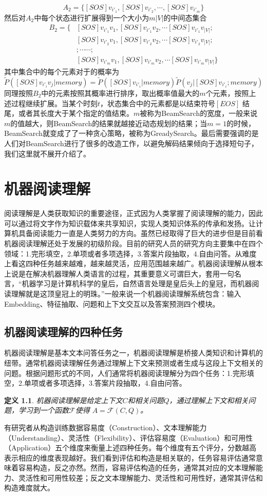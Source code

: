 \documentclass[twoside,a4paper,12pt]{book}%
\newtheorem{definition}{定义}
\begin{document}
$$
A_2=\{[SOS]v_{i'_1},[SOS]v_{i'_2},\cdots,[SOS]v_{i'_m}\}
$$
然后对$A_2$中每个状态进行扩展得到一个大小为$m|V|$的中间态集合
$$
\begin{aligned}
B_2=\{
&[SOS]v_{i'_1}v_1,[SOS]v_{i'_1}v_2,\cdots [SOS]v_{i'_1}v_{|V|};\\
&[SOS]v_{i'_2}v_1,[SOS]v_{i'_2}v_2,\cdots [SOS]v_{i'_2}v_{|V|};\\
&;\cdots \cdots;\\
&[SOS]v_{i'_m}v_1,[SOS]v_{i'_m}v_2,\cdots [SOS]v_{i'_m}v_{|V|}
\}
\end{aligned}
$$
其中集合中的每个元素对于的概率为
$$
\widetilde{P}([SOS]v_{i'_i}v_j|memory)=\widetilde{P}([SOS]v_{i'_i}|memory)\widetilde{P}(v_j|[SOS]v_{i'_i};memory)
$$
同理按照$B_2$中的元素按照其概率进行排序，取出概率值最大的$m$个元素，按照上述过程继续扩展。当某个时刻$t$，状态集合中的元素都是以结束符号$[EOS]$
结尾，或者其长度大于某个指定的值结束。$m$被称为BeamSearch的宽度，一般来说$m$的值越大，则BeamSearch的结果就越接近动态规划的结果；当$m=1$的时候，BeamSearch就变成了了一种贪心策略，被称为GreadySearch。最后需要强调的是人们对BeamSearch进行了很多的改造工作，以避免解码结果倾向于选择短句子，我们这里就不展开介绍了。

\chapter{机器阅读理解}
阅读理解是人类获取知识的重要途径，正式因为人类掌握了阅读理解的能力，因此可以通过将文字作为知识载体来共享知识，实现人类知识体系的传承和发扬。让计算机具备阅读能力一直是人类努力的方向。虽然已经取得了巨大的进步但是目前看机器阅读理解还处于发展的初级阶段。目前的研究人员的研究方向主要集中在四个领域：1.完形填空，2.单项或者多项选择，3.答案片段抽取，4.自由问答。从难度上看这四种任务越来越难，越来越灵活，应用范围越来越广。机器阅读理解从根本上说是在解决机器理解人类语言的过程，其重要意义可谓巨大，套用一句名言，“机器学习是计算机科学的皇后，自然语言处理是皇后头上的皇冠，而机器阅读理解就是这顶皇冠上的明珠。”一般来说一个机器阅读理解系统包含：输入Embedding、特征抽取、问题和上下文交互以及答案预测四个模块。

\section{机器阅读理解的四种任务}
机器阅读理解是基本文本问答任务之一，机器阅读理解是桥接人类知识和计算机的纽带。通常机器阅读理解任务通过理解上下文来预测或者生成与这段上下文相关的问题。根据问题形式的不同，人们通常将机器阅读理解分为四个任务：1.完形填空，2.单项或者多项选择，3.答案片段抽取，4.自由问答。
\begin{definition}
机器阅读理解是给定上下文$C$和相关问题$Q$，通过理解上下文和相关问题，学习到一个函数$\mathcal{F}$使得
$A=\mathcal{F}(C,Q)$。
\end{definition}
有研究者从构造训练数据容易度（Construction）、文本理解能力（Understanding）、灵活性（Flexibility）、评估容易度（Evaluation）和可用性（Application）五个维度来衡量上述四种任务。每个维度有五个评分，分数越高表示相应的维度表现越好。我们看到评估和构造是相关联的，任务容易评估通常意味着容易构造，反之亦然。然而，容易评估构造的任务，通常其对应的文本理解能力、灵活性和可用性较差；反之文本理解能力、灵活性和可用性好，通常其评估和构造难度就大。
\end{document}
